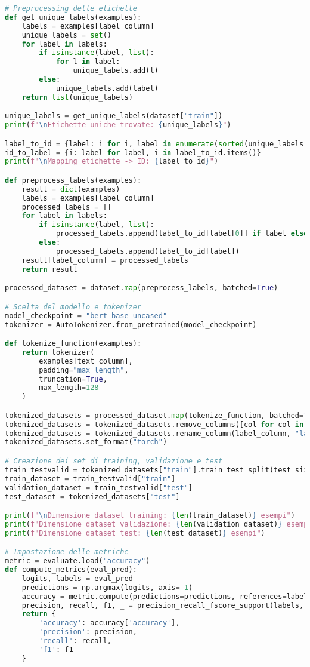 \documentclass[a4paper,12pt]{article}
\begin{document}
\begin{lstlisting}[language=Python, caption={Versione Finale --- Codice Completo}]
# Preprocessing delle etichette
def get_unique_labels(examples):
    labels = examples[label_column]
    unique_labels = set()
    for label in labels:
        if isinstance(label, list):
            for l in label:
                unique_labels.add(l)
        else:
            unique_labels.add(label)
    return list(unique_labels)

unique_labels = get_unique_labels(dataset["train"])
print(f"\nEtichette uniche trovate: {unique_labels}")

label_to_id = {label: i for i, label in enumerate(sorted(unique_labels))}
id_to_label = {i: label for label, i in label_to_id.items()}
print(f"\nMapping etichette -> ID: {label_to_id}")

def preprocess_labels(examples):
    result = dict(examples)
    labels = examples[label_column]
    processed_labels = []
    for label in labels:
        if isinstance(label, list):
            processed_labels.append(label_to_id[label[0]] if label else 0)
        else:
            processed_labels.append(label_to_id[label])
    result[label_column] = processed_labels
    return result

processed_dataset = dataset.map(preprocess_labels, batched=True)

# Scelta del modello e tokenizer
model_checkpoint = "bert-base-uncased"
tokenizer = AutoTokenizer.from_pretrained(model_checkpoint)

def tokenize_function(examples):
    return tokenizer(
        examples[text_column],
        padding="max_length",
        truncation=True,
        max_length=128
    )

tokenized_datasets = processed_dataset.map(tokenize_function, batched=True)
tokenized_datasets = tokenized_datasets.remove_columns([col for col in processed_dataset["train"].column_names if col != label_column])
tokenized_datasets = tokenized_datasets.rename_column(label_column, "labels")
tokenized_datasets.set_format("torch")

# Creazione dei set di training, validazione e test
train_testvalid = tokenized_datasets["train"].train_test_split(test_size=0.2, seed=42)
train_dataset = train_testvalid["train"]
validation_dataset = train_testvalid["test"]
test_dataset = tokenized_datasets["test"]

print(f"\nDimensione dataset training: {len(train_dataset)} esempi")
print(f"Dimensione dataset validazione: {len(validation_dataset)} esempi")
print(f"Dimensione dataset test: {len(test_dataset)} esempi")

# Impostazione delle metriche
metric = evaluate.load("accuracy")
def compute_metrics(eval_pred):
    logits, labels = eval_pred
    predictions = np.argmax(logits, axis=-1)
    accuracy = metric.compute(predictions=predictions, references=labels)
    precision, recall, f1, _ = precision_recall_fscore_support(labels, predictions, average='weighted')
    return {
        'accuracy': accuracy['accuracy'],
        'precision': precision,
        'recall': recall,
        'f1': f1
    }


\end{lstlisting}
\end{document}
